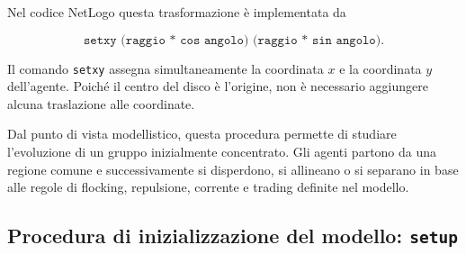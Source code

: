 Nel codice NetLogo questa trasformazione è implementata da

\[
\texttt{setxy (raggio * cos angolo) (raggio * sin angolo)}.
\]

Il comando \texttt{setxy} assegna simultaneamente la coordinata \(x\) e la
coordinata \(y\) dell'agente. Poiché il centro del disco è l'origine, non è
necessario aggiungere alcuna traslazione alle coordinate.

Dal punto di vista modellistico, questa procedura permette di studiare
l'evoluzione di un gruppo inizialmente concentrato. Gli agenti partono da una
regione comune e successivamente si disperdono, si allineano o si separano in
base alle regole di flocking, repulsione, corrente e trading definite nel
modello.

\subsection{Procedura di inizializzazione del modello: \texttt{setup}}

